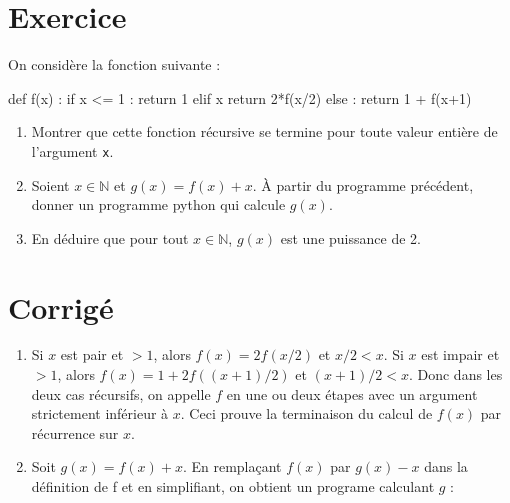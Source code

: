 \documentclass[10pt,fleqn]{book} %
\begin{document}

\vspace{7cm}
\pagestyle{fancy}
\thispagestyle{plain}

\setcounter{secnumdepth}{5}
\def\columnseprulecolor{\color{ocre}}
\setlength{\columnseprule}{0.4pt} 

\ifprof
\else
\begin{multicols}{2}
\fi



\section*{Exercice }
On considère la fonction suivante :\\
\begin{python}
def f(x) :
    if x <= 1 :
	return 1
    elif x %
	return 2*f(x/2)
    else :
	return 1 + f(x+1)
\end{python}

\begin{enumerate}
\item Montrer que cette fonction récursive se termine pour toute valeur entière 
de l'argument \texttt{x}.
\item Soient $x\in\mathbb N$ et $g(x)=f(x)+x$. À partir du programme précédent, donner 
un programme python qui calcule $g(x)$.
\item En déduire que pour tout $x\in\mathbb N$, $g(x)$ est une puissance de 2.
\end{enumerate}




\section*{Corrigé }

\begin{enumerate}
\item Si $x$ est pair et $> 1$, alors $f (x) = 2f (x/2)$ et $ x/2 < x$. Si $x$ est impair et
 $ > 1$, alors $f (x) = 1 + 2f ((x + 1)/2)$ et $(x + 1)/2 < x$. Donc dans les deux cas
     récursifs, on appelle $f$ en une ou deux étapes avec un argument strictement
     inférieur à $x$. Ceci prouve la terminaison du calcul de $f (x)$ par récurrence
     sur $x$.
\item Soit $g(x) = f (x) + x$. En remplaçant $f (x)$ par $g(x)- x$ dans la définition de
    $ $f et en simplifiant, on obtient un programe calculant $g$ :\\
    

\end{enumerate}
\end{multicols}
\end{document}
